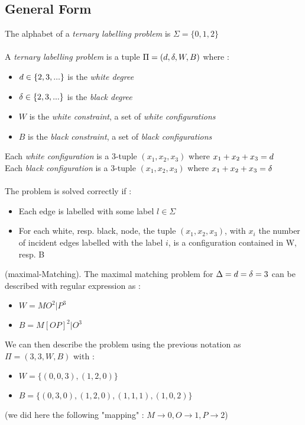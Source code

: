 \subsection{General Form}
The alphabet of a \textit{ternary labelling problem} is $\Sigma = \{0,1,2\}$\\\\
A \textit{ternary labelling problem} is a tuple $\Pi = (d,\delta,W,B)$ where :
\begin{itemize}
    \item $d\in\{2,3,...\}$ is the \textit{white degree}
    \item $\delta\in\{2,3,...\}$ is the \textit{black degree}
    \item $W$ is the \textit{white constraint}, a set of \textit{white configurations}
    \item $B$ is the \textit{black constraint}, a set of \textit{black configurations}
\end{itemize}
Each \textit{white configuration} is a 3-tuple $(x_1,x_2,x_3)$ where $x_1+x_2+x_3 = d$\\
Each \textit{black configuration} is a 3-tuple $(x_1,x_2,x_3)$ where $x_1+x_2+x_3 = \delta$\\\\
The problem is solved correctly if :
\begin{itemize}
    \item Each edge is labelled with some label $l\in\Sigma$
    \item For each white, resp. black, node, the tuple $(x_1,x_2, x_3)$, with $x_i$ the number of incident edges labelled with the label $i$, is a configuration contained in W, resp. B
\end{itemize}
\begin{exmp}
(maximal-Matching). The maximal matching problem for $\Delta = d = \delta = 3$ can be described with regular expression as :
\begin{itemize}
    \item $W = MO^{2}|P^{3}$
    \item $B = M[OP]^{2}|O^{3}$
\end{itemize}
We can then describe the problem using the previous notation as
$\Pi = (3,3,W,B)$ with :
\begin{itemize}
    \item $W = \{(0,0,3),(1, 2, 0)\}$
    \item $B = \{(0,3,0),(1,2,0),(1,1,1),(1,0,2)\}$
\end{itemize}
(we did here the following "mapping" : $M\rightarrow 0, O\rightarrow 1, P\rightarrow 2$)
\end{exmp}
